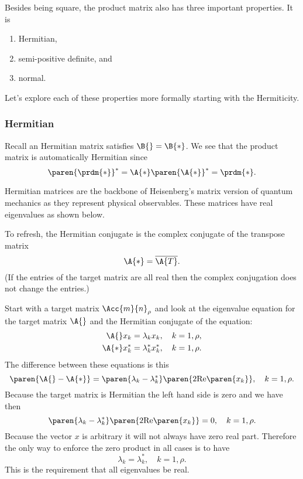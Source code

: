 Besides being square, the product matrix also has three important properties. It is
\begin{enumerate}
  \item Hermitian,
  \item semi-positive definite, and
  \item normal.
\end{enumerate} 

Let's explore each of these properties more formally starting with the Hermiticity. 


\subsubsection{Hermitian}
Recall an Hermitian matrix satisfies $ \B{} = \B{*} $. We see that the product matrix is automatically Hermitian since
\begin{equation}
  \paren{\prdm{*}}^{*}=\A{*}\paren{\A{*}}^{*} = \prdm{*}.
\end{equation}

Hermitian matrices are the backbone of Heisenberg's matrix version of quantum mechanics as they represent physical observables. These matrices have real eigenvalues as shown below.

To refresh, the Hermitian conjugate is the complex conjugate of the transpose matrix
\begin{equation*}
  \A{*} = \overline{\A{T}}.
\end{equation*}
(If the entries of the target matrix are all real then the complex conjugation does not change the entries.)

Start with a target matrix $\Acc{m}{n}_{\rho}$ and look at the eigenvalue equation for the target matrix $\A{}$ and the Hermitian conjugate of the equation:
\begin{equation}
\begin{split}
  \A{}x_{k} &= \lambda_{k}x_{k}, \quad k=1,\rho,\\
  \A{*}x^{*}_{k} &= \lambda^{*}_{k}x^{*}_{k}, \quad k=1,\rho.\\
\end{split}
\end{equation}
The difference between these equations is this
\begin{equation}
  \paren{\A{}-\A{*}} = \paren{\lambda_{k}-\lambda^{*}_{k}}\paren{2 \text{Re}\paren{x_{k}}}, \quad k=1,\rho.
\end{equation}
Because the target matrix is Hermitian the left hand side is zero and we have then
\begin{equation}
  \paren{\lambda_{k}-\lambda^{*}_{k}}\paren{2 \text{Re}\paren{x_{k}}}=0, \quad k=1,\rho.
\end{equation}
Because the vector $x$ is arbitrary it will not always have zero real part. Therefore the only way to enforce the zero product in all cases is to have
\begin{equation}
  \lambda_{k} = \lambda^{*}_{k}, \quad k=1,\rho.
\end{equation}
This is the requirement that all eigenvalues be real.

